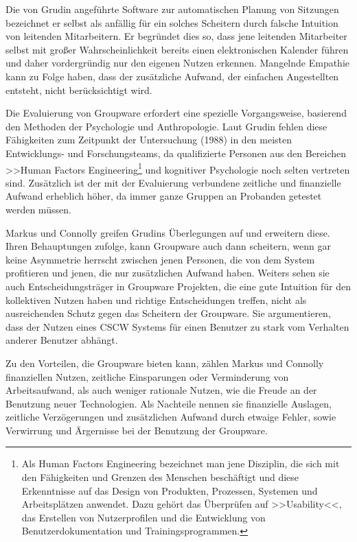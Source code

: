 Die von Grudin angeführte Software zur automatischen Planung von Sitzungen bezeichnet er selbst als anfällig für ein solches Scheitern durch falsche Intuition von leitenden Mitarbeitern. Er begründet dies so, dass jene leitenden Mitarbeiter selbst mit großer Wahrscheinlichkeit bereits einen elektronischen Kalender führen und daher vordergründig nur den eigenen Nutzen erkennen. Mangelnde Empathie kann zu Folge haben, dass der zusätzliche Aufwand, der einfachen Angestellten entsteht, nicht berücksichtigt wird.

\medskip Die Evaluierung von Groupware erfordert eine spezielle Vorgangsweise, basierend den Methoden der Psychologie und Anthropologie. Laut Grudin fehlen diese Fähigkeiten zum Zeitpunkt der Untersuchung (1988) in den meisten Entwicklungs- und Forschungsteams, da qualifizierte Personen aus den Bereichen >>Human Factors Engineering\footnote{Als Human Factors Engineering bezeichnet man jene Disziplin, die sich mit den Fähigkeiten und Grenzen des Menschen beschäftigt und diese Erkenntnisse auf das Design von Produkten, Prozessen, Systemen und Arbeitsplätzen anwendet. Dazu gehört das Überprüfen auf >>Usability<<, das Erstellen von Nutzerprofilen und die Entwicklung von Benutzerdokumentation und Trainingsprogrammen.} und kognitiver Psychologie noch selten vertreten sind. Zusätzlich ist der mit der Evaluierung verbundene zeitliche und finanzielle Aufwand erheblich höher, da immer ganze Gruppen an Probanden getestet werden müssen. \citep{Grudin:1988p126}

\medskip Markus und Connolly greifen Grudins Überlegungen auf und erweitern diese. Ihren Behauptungen zufolge, kann Groupware auch dann scheitern, wenn gar keine Asymmetrie herrscht zwischen jenen Personen, die von dem System profitieren und jenen, die nur zusätzlichen Aufwand haben. Weiters sehen sie auch Entscheidungsträger in Groupware Projekten, die eine gute Intuition für den kollektiven Nutzen haben und richtige Entscheidungen treffen, nicht als ausreichenden Schutz gegen das Scheitern der Groupware. Sie argumentieren, dass der Nutzen eines CSCW Systems für einen Benutzer zu stark vom Verhalten anderer Benutzer abhängt. \citep{Markus:1990}

\medskip Zu den Vorteilen, die Groupware bieten kann, zählen Markus und Connolly finanziellen Nutzen, zeitliche Einsparungen oder Verminderung von Arbeitsaufwand, als auch weniger rationale Nutzen, wie die Freude an der Benutzung neuer Technologien. Als Nachteile nennen sie finanzielle Auslagen, zeitliche Verzögerungen und zusätzlichen Aufwand durch etwaige Fehler, sowie Verwirrung und Ärgernisse bei der Benutzung der Groupware. 

